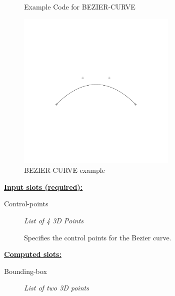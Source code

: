 \documentclass [11pt]{book}
\begin{document}
\begin{itemize}
\begin{figure}
\caption{Example Code for BEZIER-CURVE}

\label{fig:example-code-BEZIER-CURVE}

\end{figure}

\begin{figure}
\begin{center}
\includegraphics[width=3in,height=3in]{../images/example-BEZIER-CURVE.pdf}
\end{center}

\caption{BEZIER-CURVE example}

\label{fig:BEZIER-CURVE}

\end{figure}





\textbf{
\underline{Input slots (required):}}

\begin{description}

\item [Control-points]
\emph{List of 4 3D Points}

 Specifies the control points for the Bezier curve.




\end{description}






\textbf{
\underline{Computed slots:}}

\begin{description}

\item [Bounding-box]
\emph{List of two 3D points}


\end{description}
\end{itemize}
\end{document}
